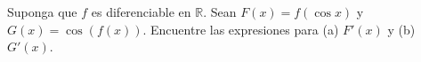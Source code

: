 \item Suponga que $f$ es diferenciable en $\mathbb{R}$. Sean $F(x) = f(\cos x)$ y $G(x) = \cos(f(x))$. Encuentre las expresiones para (a) $F'(x)$ y (b) $G'(x)$.
